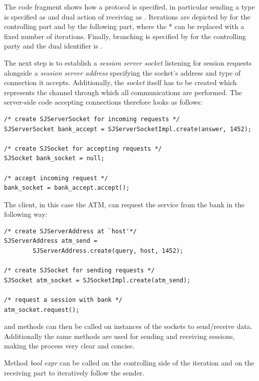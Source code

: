 The code fragment shows how a protocol is specified, in particular sending a type is specified as  and dual action of receiving as . Iterations are depicted by \LST{![...]*} for the controlling part and  by the following part, where the * can be replaced with a fixed number of iterations. Finally, branching is specified by  for the controlling party and the dual identifier is .

The next step is to establish a \textit{session server socket} listening for session requests alongside a \textit{session server address} specifying the socket's address and type of connection it accepts. Additionally, the \textit{socket} itself has to be created which represents the channel through which all communications are performed. The server-side code accepting connections therefore looks as follows:

\begin{lstlisting}[basicstyle=\LISTINGSTYLE]
/* create SJServerSocket for incoming requests */
SJServerSocket bank_accept = SJServerSocketImpl.create(answer, 1452);

/* create SJSocket for accepting requests */
SJSocket bank_socket = null;

/* accept incoming request */
bank_socket = bank_accept.accept();
\end{lstlisting}

The client, in this case the ATM, can request the service from the bank in the following way:

\begin{lstlisting}[basicstyle=\LISTINGSTYLE]
/* create SJServerAddress at `host'*/
SJServerAddress atm_send =
        SJServerAddress.create(query, host, 1452);

/* create SJSocket for sending requests */
SJSocket atm_socket = SJSocketImpl.create(atm_send);

/* request a session with bank */
atm_socket.request();
\end{lstlisting}

 and  methods can then be called on instances of the sockets to send/receive data. Additionally the same methods are used for sending and receiving sessions, making the process very clear and concise.

Method \textit{bool expr}\LST{)} can be called on the controlling side of the iteration and  on the receiving part to iteratively follow the sender.

